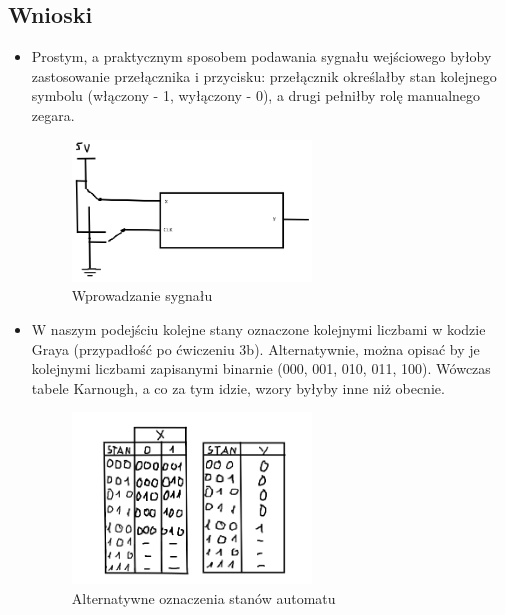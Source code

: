\documentclass{article}
\begin{document}
\subsection{Wnioski}
\begin{itemize}
    \item
    Prostym, a praktycznym sposobem podawania sygnału wejściowego byłoby zastosowanie przełącznika i przycisku:
    przełącznik określałby stan kolejnego symbolu (włączony - 1, wyłączony - 0), a drugi pełniłby rolę manualnego zegara.

    \begin{figure}[H]
        \centering
        \includegraphics[width=0.6\textwidth]{3c_wpr.jpg}
        \caption{Wprowadzanie sygnału}
    \end{figure}

    \item
    W naszym podejściu kolejne stany oznaczone kolejnymi liczbami w kodzie Graya (przypadłość po ćwiczeniu 3b). Alternatywnie, można
    opisać by je kolejnymi liczbami zapisanymi binarnie (000, 001, 010, 011, 100). Wówczas tabele Karnough, a co za tym idzie,
    wzory byłyby inne niż obecnie.

    \begin{figure}[H]
        \centering
        \includegraphics[width=0.6\textwidth]{3c_alt.jpg}
        \caption{Alternatywne oznaczenia stanów automatu}
    \end{figure}


\end{itemize}
\end{document}
